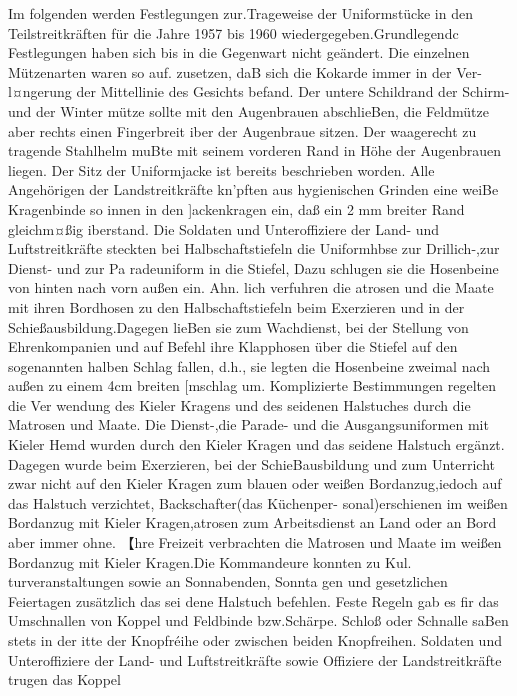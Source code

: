 

Im folgenden werden Festlegungen zur.Trageweise
der Uniformstücke in den Teilstreitkräften für die
Jahre 1957 bis 1960 wiedergegeben.Grundlegendc
Festlegungen haben sich bis in die Gegenwart nicht
geändert. Die einzelnen Mützenarten waren so auf.
zusetzen, daB sich die Kokarde immer in der Ver-
l¤ngerung der Mittellinie des Gesichts befand. Der
untere Schildrand der Schirm- und der Winter
mütze sollte mit den Augenbrauen abschlieBen, die
Feldmütze aber rechts einen Fingerbreit iber der
Augenbraue sitzen. Der waagerecht zu tragende
Stahlhelm muBte mit seinem vorderen Rand in
Höhe der Augenbrauen liegen.
Der Sitz der Uniformjacke ist bereits beschrieben
worden. Alle Angehörigen der Landstreitkräfte
kn'pften aus hygienischen Grinden eine weiBe
Kragenbinde so innen in den ]ackenkragen ein, daß
ein 2 mm breiter Rand gleichm¤ßig iberstand.
Die Soldaten und Unteroffiziere der Land- und
Luftstreitkräfte steckten bei Halbschaftstiefeln die
Uniformhbse zur Drillich-,zur Dienst- und zur Pa
radeuniform in die Stiefel, Dazu schlugen sie die
Hosenbeine von hinten nach vorn außen ein. Ahn.
lich verfuhren die atrosen und die Maate mit
ihren Bordhosen zu den Halbschaftstiefeln beim
Exerzieren und in der Schießausbildung.Dagegen
lieBen sie zum Wachdienst, bei der Stellung von
Ehrenkompanien und auf Befehl ihre Klapphosen
über die Stiefel auf den sogenannten halben Schlag
fallen, d.h., sie legten die Hosenbeine zweimal nach
außen zu einem 4cm breiten [mschlag um.
Komplizierte Bestimmungen regelten die Ver
wendung des Kieler Kragens und des seidenen
Halstuches durch die Matrosen und Maate. Die Dienst-,die Parade- und die Ausgangsuniformen
mit Kieler Hemd wurden durch den Kieler Kragen
und das seidene Halstuch ergänzt. Dagegen wurde
beim Exerzieren, bei der SchieBausbildung und
zum Unterricht zwar nicht auf den Kieler Kragen
zum blauen oder weißen Bordanzug,iedoch auf das
Halstuch verzichtet, Backschafter(das Küchenper-
sonal)erschienen im weißen Bordanzug mit Kieler
Kragen,atrosen zum Arbeitsdienst an Land oder
an Bord aber immer ohne. 【hre Freizeit verbrachten
die Matrosen und Maate im weißen Bordanzug mit
Kieler Kragen.Die Kommandeure konnten zu Kul.
turveranstaltungen sowie an Sonnabenden, Sonnta
gen und gesetzlichen Feiertagen zusätzlich das sei
dene Halstuch befehlen.
Feste Regeln gab es fir das Umschnallen von
Koppel und Feldbinde bzw.Schärpe. Schloß oder
Schnalle saBen stets in der itte der Knopfréihe
oder zwischen beiden Knopfreihen. Soldaten und
Unteroffiziere der Land- und Luftstreitkräfte sowie
Offiziere der Landstreitkräfte trugen das Koppel
